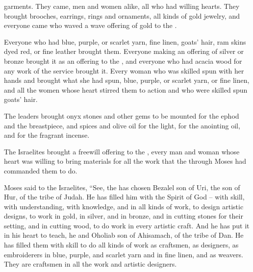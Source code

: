 {garments.
They came,
men
and women
alike, all
who had
willing
hearts.
They brought
brooches,
earrings,
rings
and ornaments,
all
kinds of gold
jewelry,
and everyone
came who
waved
a wave offering
of gold
to the
{}.
\par }{\PP {}Everyone
who had
blue,
purple,
or scarlet
yarn,
fine linen,
goats’
hair, ram
skins
dyed red,
or fine
leather
brought them.
Everyone
making
an offering
of silver
or bronze
brought
it as an offering
to the
{}, and everyone
who
had acacia
wood
for any
work
of the service
brought it.
Every
woman
who was skilled
spun
with her hands
and brought
what she had spun,
blue,
purple,
or scarlet
yarn,
or fine linen,
and all
the women
whose
heart stirred
them to action and who were skilled
spun
goats’ hair.
\par }{\PP {}The leaders
brought
onyx
stones
and other gems
to be mounted
for the ephod
and the breastpiece,
and spices
and olive oil
for the light,
for the anointing
oil,
and for the fragrant
incense.
\par }{\PP {}The Israelites
brought
a freewill
offering to the
{}, every
man
and woman
whose
heart
was willing
to bring
materials for all
the work
that
the {}
through
Moses
had commanded
them to do.
\par }{\PP {}Moses
said
to
the Israelites,
“See,
the {}
has chosen
Bezalel
son
of Uri,
the son
of Hur,
of the tribe
of Judah.
He has filled
him with the Spirit
of God
– with skill,
with understanding,
with knowledge,
and in all
kinds of work,
to design artistic
designs,
to work
in gold,
in silver,
and in bronze,
and in cutting
stones
for their setting,
and in cutting
wood,
to do
work
in every
artistic craft.
And he has put
it
in his heart
to teach,
he and Oholiab
son
of Ahisamach,
of the tribe
of Dan.
He has filled
them with skill
to do
all
kinds of work
as craftsmen,
as designers,
as embroiderers
in blue,
purple,
and scarlet
yarn
and in fine linen,
and as weavers.
They are craftsmen in all
the work
and artistic
designers.

}
